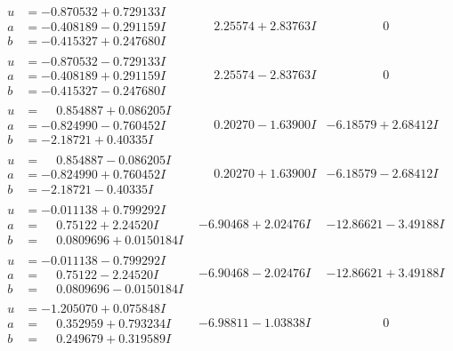 \documentclass[1p]{elsarticle_modified}
\theoremstyle{definition}
\begin{document}
$$\begin{array}{c|c|c}
\begin{aligned}
u &= -0.870532 + 0.729133 I \\
a &= -0.408189 - 0.291159 I \\
b &= -0.415327 + 0.247680 I\end{aligned}
 & \phantom{-}2.25574 + 2.83763 I & \phantom{-0.000000 } 0 \\ \hline\begin{aligned}
u &= -0.870532 - 0.729133 I \\
a &= -0.408189 + 0.291159 I \\
b &= -0.415327 - 0.247680 I\end{aligned}
 & \phantom{-}2.25574 - 2.83763 I & \phantom{-0.000000 } 0 \\ \hline\begin{aligned}
u &= \phantom{-}0.854887 + 0.086205 I \\
a &= -0.824990 - 0.760452 I \\
b &= -2.18721 + 0.40335 I\end{aligned}
 & \phantom{-}0.20270 - 1.63900 I & -6.18579 + 2.68412 I \\ \hline\begin{aligned}
u &= \phantom{-}0.854887 - 0.086205 I \\
a &= -0.824990 + 0.760452 I \\
b &= -2.18721 - 0.40335 I\end{aligned}
 & \phantom{-}0.20270 + 1.63900 I & -6.18579 - 2.68412 I \\ \hline\begin{aligned}
u &= -0.011138 + 0.799292 I \\
a &= \phantom{-}0.75122 + 2.24520 I \\
b &= \phantom{-}0.0809696 + 0.0150184 I\end{aligned}
 & -6.90468 + 2.02476 I & -12.86621 - 3.49188 I \\ \hline\begin{aligned}
u &= -0.011138 - 0.799292 I \\
a &= \phantom{-}0.75122 - 2.24520 I \\
b &= \phantom{-}0.0809696 - 0.0150184 I\end{aligned}
 & -6.90468 - 2.02476 I & -12.86621 + 3.49188 I \\ \hline\begin{aligned}
u &= -1.205070 + 0.075848 I \\
a &= \phantom{-}0.352959 + 0.793234 I \\
b &= \phantom{-}0.249679 + 0.319589 I\end{aligned}
 & -6.98811 - 1.03838 I & \phantom{-0.000000 } 0 \\ \hline\begin{aligned}

\end{aligned}
\end{array}$$
\end{document}
